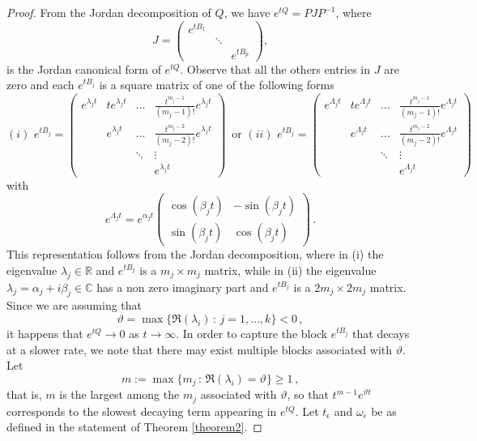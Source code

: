 \documentclass[12pt,thmsa]{article}
\begin{document}
\begin{proof} From the Jordan decomposition of $Q$, we have  $e^{tQ}=PJP^{-1}$, where
	$$J=\begin{pmatrix}
		e^{tB_1}& & \\ 
		&\ddots &  \\
		& & e^{tB_p} 
	\end{pmatrix},$$
	is the Jordan canonical form of $e^{tQ}$. Observe that all the others entries in $J$ are zero and each $e^{tB_j}$ is a square matrix of one of the following forms
	\begin{equation}\label{eq:Jordan}
		(i)\,\, e^{tB_j}=\begin{pmatrix}
			e^{\lambda_j t}&te^{\lambda_j t}&\dots&\frac{t^{m_j-1}}{(m_j-1)!}e^{\lambda_j t}\\ 
			&e^{\lambda_j t}&\dots&\frac{t^{m_j-2}}{(m_j-2)!}e^{\lambda_j t}\\
			& &\ddots & \vdots \\
			& & & e^{\lambda_j t } 
		\end{pmatrix}\,\mbox{ or } (ii)\,\, e^{tB_j}=\begin{pmatrix}e^{\Lambda_j t}&te^{\Lambda_j t}&\dots&\frac{t^{m_j-1}}{(m_j-1)!}e^{\Lambda_j t}\\ 
			&e^{\Lambda_j t}&\dots&\frac{t^{m_j-2}}{(m_j-2)!}e^{\Lambda_j t}\\
			& &\ddots & \vdots \\
			& & & e^{\Lambda_j t }\end{pmatrix}
	\end{equation}
	with 
	$$e^{\Lambda_j t}=e^{\alpha_jt} \begin{pmatrix}\cos\left(\beta_j t\right)&-\sin\left(\beta_j t\right)\\
		\sin\left(\beta_j t\right)& \cos\left(\beta_j t\right)\end{pmatrix}\,.$$
	This representation follows from the Jordan decomposition, where in (i) the eigenvalue $\lambda_j\in\mathbb{R}$ and $e^{tB_j}$ is a $m_j\times m_j$ matrix,  while in (ii) the eigenvalue $\lambda_j=\alpha_j+i\beta_j\in\mathbb{C}$ has a non zero imaginary part and $e^{tB_j}$ is a $2m_j\times 2m_j$ matrix. Since we are assuming that 
	\[
	\vartheta=\max \{ \Re(\lambda_i)\,:\,j=1,\dots,k \} <0\,,
	\] 
	it happens that $e^{tQ}\to 0$ as $t\to\infty$. In order to capture the block $e^{tB_j}$
	that decays at a slower rate, we note that there may exist multiple blocks associated with 
	$\vartheta$.  Let
	$$m:=\max\{m_j\,:\,\Re(\lambda_i)=\vartheta\}\geq 1\,, $$ 
	that is, $m$ is the largest among the $m_j$ associated with $\vartheta$, so that $t^{m-1}e^{\vartheta t}$  corresponds to the slowest decaying term appearing in $e^{tQ}$. Let  $t_\epsilon$  and  $\omega_\epsilon$ be as defined  in the statement of Theorem \ref{theorem2}.

\end{proof}
\end{document}
